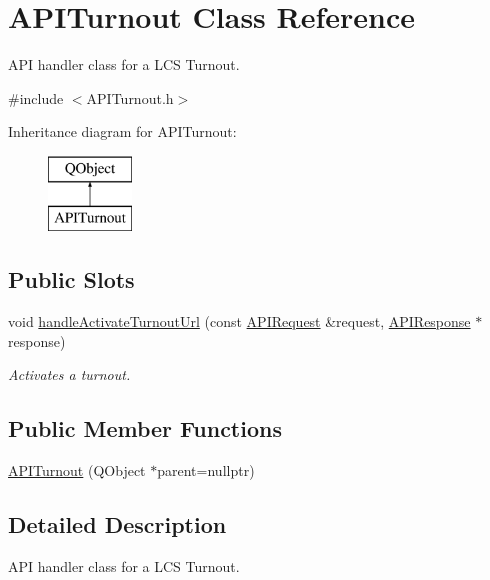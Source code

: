\hypertarget{class_a_p_i_turnout}{}\section{A\+P\+I\+Turnout Class Reference}
\label{class_a_p_i_turnout}


A\+PI handler class for a L\+CS Turnout.  




{\ttfamily \#include $<$A\+P\+I\+Turnout.\+h$>$}

Inheritance diagram for A\+P\+I\+Turnout\+:\begin{figure}[H]
\begin{center}
\leavevmode
\includegraphics[height=2.000000cm]{class_a_p_i_turnout}
\end{center}
\end{figure}
\subsection*{Public Slots}
\begin{DoxyCompactItemize}
\item 
void \hyperlink{class_a_p_i_turnout_a56cef33f12b9d8c13aa8cdce7e24bf0c}{handle\+Activate\+Turnout\+Url} (const \hyperlink{class_a_p_i_request}{A\+P\+I\+Request} \&request, \hyperlink{class_a_p_i_response}{A\+P\+I\+Response} $\ast$response)
\begin{DoxyCompactList}\small\item\em Activates a turnout. \end{DoxyCompactList}\end{DoxyCompactItemize}
\subsection*{Public Member Functions}
\begin{DoxyCompactItemize}
\item 
\hyperlink{class_a_p_i_turnout_a6c730f3cc2cee54be17e110770b9070b}{A\+P\+I\+Turnout} (Q\+Object $\ast$parent=nullptr)
\end{DoxyCompactItemize}


\subsection{Detailed Description}
A\+PI handler class for a L\+CS Turnout. 

